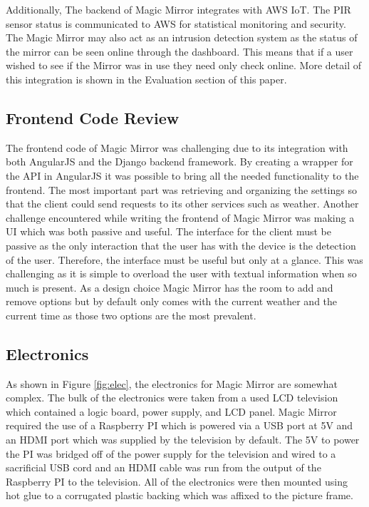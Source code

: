 \documentclass[conference]{IEEEtran}
\begin{document}
Additionally, The backend of Magic Mirror integrates with AWS IoT.
The PIR sensor status is communicated to AWS for statistical monitoring and security.
The Magic Mirror may also act as an intrusion detection system as the status of the mirror can be seen online through the dashboard.
This means that if a user wished to see if the Mirror was in use they need only check online.
More detail of this integration is shown in the Evaluation section of this paper.

\subsection{Frontend Code Review}
The frontend code of Magic Mirror was challenging due to its integration with both AngularJS and the Django backend framework.
By creating a wrapper for the API in AngularJS it was possible to bring all the needed functionality to the frontend.
The most important part was retrieving and organizing the settings so that the client could send requests to its other services such as weather.
Another challenge encountered while writing the frontend of Magic Mirror was making a UI which was both passive and useful.
The interface for the client must be passive as the only interaction that the user has with the device is the detection of the user.
Therefore, the interface must be useful but only at a glance.
This was challenging as it is simple to overload the user with textual information when so much is present.
As a design choice Magic Mirror has the room to add and remove options but by default only comes with the current weather and the current time as those two options are the most prevalent.

\subsection{Electronics}
As shown in Figure \ref{fig:elec}, the electronics for Magic Mirror are somewhat complex.
The bulk of the electronics were taken from a used LCD television which contained a logic board, power supply, and LCD panel.
Magic Mirror required the use of a Raspberry PI which is powered via a USB port at 5V and an HDMI port which was supplied by the television by default.
The 5V to power the PI was bridged off of the power supply for the television and wired to a sacrificial USB cord and an HDMI cable was run from the output of the Raspberry PI to the television.
All of the electronics were then mounted using hot glue to a corrugated plastic backing which was affixed to the picture frame.
\end{document}
